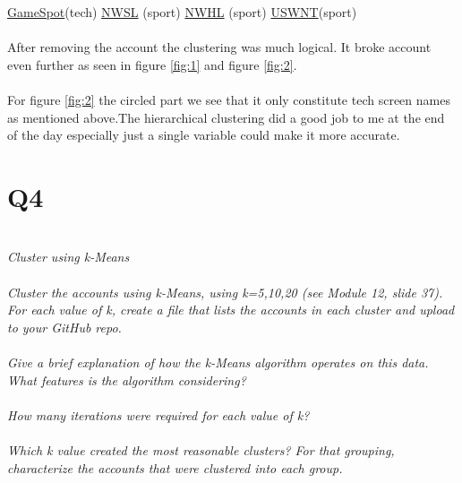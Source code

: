 \documentclass[12pt]{article}
\begin{document}
\begin{itemize}
        \href{https://twitter.com/GameSpot?s=20}{GameSpot}(tech)
        \href{https://twitter.com/NWSL?s=20}{NWSL} (sport)
        \href{https://twitter.com/NWHL?s=20}{NWHL} (sport)
        \href{https://twitter.com/USWNT?s=20}{USWNT}(sport)\\ \\
        After removing the account the clustering was much logical. It broke account even further as seen in figure \ref{fig:1} and figure \ref{fig:2}. \\ \\ For figure \ref{fig:2} the circled part we see that it only constitute tech screen names as mentioned above.The hierarchical clustering did a good  job to me at the end of the day especially just a single variable could make it more accurate.
    \end{itemize}
    
\section*{Q4}
\emph{
\\Cluster using k-Means
\\ \\Cluster the accounts using k-Means, using k=5,10,20 (see Module 12, slide 37). For each value of k, create a file that lists the accounts in each cluster and upload to your GitHub repo.
\\ \\Give a brief explanation of how the k-Means algorithm operates on this data. What features is the algorithm considering?
\\ \\How many iterations were required for each value of k?
\\ \\Which k value created the most reasonable clusters? For that grouping, characterize the accounts that were clustered into each group.}
\subsection*{\color{blue}{Answer}}
\emph{}
 
\end{document}
